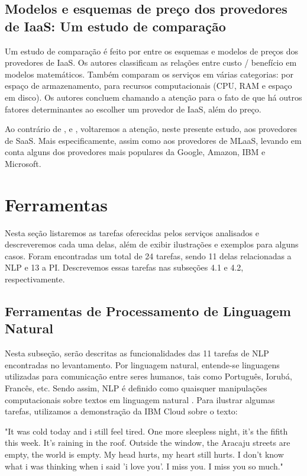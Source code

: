 \documentclass{article}
\begin{document}
\subsection{Modelos e esquemas de preço dos provedores de IaaS: Um estudo de comparação}
Um estudo de comparação é feito por \cite{murthy2012pricing} entre os esquemas e modelos de preços dos provedores de IaaS. Os autores classificam as relações entre custo / benefício em modelos matemáticos. Também comparam os serviços em várias categorias: por espaço de armazenamento, para recursos computacionais (CPU, RAM e espaço em disco). Os autores concluem chamando a atenção para o fato de que há outros fatores determinantes ao escolher um provedor de IaaS, além do preço.

Ao contrário de \cite{peng2009comparison}, \cite{hyseni2017comparison} e \cite{murthy2012pricing}, voltaremos a atenção, neste presente estudo, aos provedores de SaaS. Mais especificamente, assim como \cite{yao2017} aos provedores de MLaaS, levando em conta alguns dos provedores mais populares da Google, Amazon, IBM e Microsoft. 


\section{Ferramentas}
Nesta seção listaremos as tarefas oferecidas pelos serviços analisados e descreveremos cada uma delas, além de exibir ilustrações e exemplos para alguns casos. Foram encontradas um total de 24 tarefas, sendo 11 delas relacionadas a NLP e 13 a PI. Descrevemos essas tarefas nas subseções 4.1 e 4.2, respectivamente.

\subsection{Ferramentas de Processamento de Linguagem Natural}
Nesta subseção, serão descritas as funcionalidades das 11 tarefas de NLP encontradas no levantamento. Por linguagem natural, entende-se linguagens utilizadas para comunicação entre seres humanos, tais como Português, Iorubá, Francês, etc. Sendo assim, NLP é definido como quaisquer manipulações computacionais sobre textos em linguagem natural \cite{nltk}. Para ilustrar algumas tarefas, utilizamos a demonstração da IBM Cloud sobre o texto: 
\begin{myquote}
        "It was cold today and i still feel tired. One more sleepless night, it's the fifith this week. It's raining in the roof. Outside the window, the Aracaju streets are empty, the world is empty. My head hurts, my heart still hurts. I don't know what i was thinking when i said 'i love you'. I miss you. I miss you so much."
\end{myquote}
\end{document}
